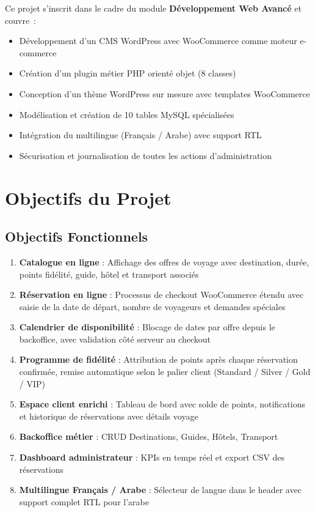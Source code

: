 \documentclass[12pt,a4paper]{report}
\begin{document}
Ce projet s'inscrit dans le cadre du module \textbf{D\'eveloppement Web Avanc\'e}
et couvre~:

\begin{itemize}
  \item D\'eveloppement d'un CMS WordPress avec WooCommerce comme moteur e-commerce
  \item Cr\'eation d'un plugin m\'etier PHP orienté objet (8 classes)
  \item Conception d'un th\`eme WordPress sur mesure avec templates WooCommerce
  \item Mod\'elisation et cr\'eation de 10 tables MySQL sp\'ecialis\'ees
  \item Int\'egration du multilingue (Fran\c{c}ais / Arabe) avec support RTL
  \item S\'ecurisation et journalisation de toutes les actions d'administration
\end{itemize}

\chapter{Objectifs du Projet}

\section{Objectifs Fonctionnels}

\begin{enumerate}
  \item \textbf{Catalogue en ligne} : Affichage des offres de voyage avec
        destination, dur\'ee, points fid\'elit\'e, guide, h\^otel et transport associ\'es
  \item \textbf{R\'eservation en ligne} : Processus de checkout WooCommerce \'etendu
        avec saisie de la date de d\'epart, nombre de voyageurs et demandes sp\'eciales
  \item \textbf{Calendrier de disponibilit\'e} : Blocage de dates par offre depuis
        le backoffice, avec validation c\^ot\'e serveur au checkout
  \item \textbf{Programme de fid\'elit\'e} : Attribution de points apr\`es chaque
        r\'eservation confirm\'ee, remise automatique selon le palier client
        (Standard / Silver / Gold / VIP)
  \item \textbf{Espace client enrichi} : Tableau de bord avec solde de points,
        notifications et historique de r\'eservations avec d\'etails voyage
  \item \textbf{Backoffice m\'etier} : CRUD Destinations, Guides, H\^otels, Transport
  \item \textbf{Dashboard administrateur} : KPIs en temps r\'eel et export CSV des
        r\'eservations
  \item \textbf{Multilingue Fran\c{c}ais / Arabe} : Sélecteur de langue dans le
        header avec support complet RTL pour l'arabe
\end{enumerate}
\end{document}
